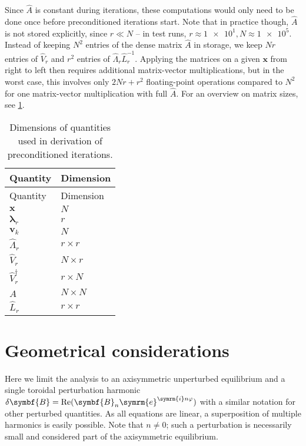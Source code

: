 \documentclass[a4paper, twoside, 10pt, english]{article}
\numberwithin{equation}{section}
\let\temp\varrho
\let\varrho\rho
\let\rho\temp
\let\temp\vartheta
\let\vartheta\theta
\let\theta\temp
\let\temp\varphi
\let\varphi\phi
\let\phi\temp
\let\vec\symbf
\DeclareMathOperator\Real{Re}
\newcommand*\e{\ensuremath{\symrm{e}}}  %
\newcommand*\im{\ensuremath{\symrm{i}}}  %
\newcommand*\Bpert{\ensuremath{\delta \vec{B}}}  %
\begin{document}
Since $\hat{A}$ is constant during iterations, these computations would only need to be done once before preconditioned iterations start. Note that in practice though, $\hat{A}$ is not stored explicitly, since $r \ll N$ -- in test runs, $r \approx \num{1e1}, N \approx \num{1e5}$. Instead of keeping $N^2$ entries of the dense matrix $\hat{A}$ in storage, we keep $N r$ entries of $\hat{V}_{r}$ and $r^2$ entries of $\hat{\Lambda}_{r} \hat{L}_{r}^{-1}$. Applying the matrices on a given $\vec{x}$ from right to left then requires additional matrix-vector multiplications, but in the worst case, this involves only $2 N r + r^2$ floating-point operations compared to $N^2$ for one matrix-vector multiplication with full $\hat{A}$. For an overview on matrix sizes, see \cref{tab:matrix_dimensions}.
\begin{longtable}{ll}
  \caption{Dimensions of quantities used in derivation of preconditioned iterations.}
  \label{tab:matrix_dimensions} \\
  \toprule
  Quantity & Dimension \\
  \midrule
  \endfirsthead
  \toprule
  Quantity & Dimension \\
  \midrule
  \endhead
  $\vec{x}$ & $N$ \\
  $\vec{\lambda}_{r}$ & $r$ \\
  $\vec{v}_{k}$ & $N$ \\
  $\hat{\Lambda}_{r}$ & $r \times r$ \\
  $\hat{V}_{r}$ & $N \times r$ \\
  $\hat{V}_{r}^{\dagger}$ & $r \times N$ \\
  $\hat{A}$ & $N \times N$ \\
  $\hat{L}_{r}$ & $r \times r$ \\
  \bottomrule
\end{longtable}

\clearpage
\section{Geometrical considerations}

Here we limit the analysis to an axisymmetric unperturbed equilibrium and a single toroidal perturbation harmonic $\Bpert = \Real (\vec{B}_{n} \e^{\im n \phi})$ with a similar notation for other perturbed quantities. As all equations are linear, a superposition of multiple harmonics is easily possible. Note that $n \neq 0$; such a perturbation is necessarily small and considered part of the axisymmetric equilibrium.
\end{document}
